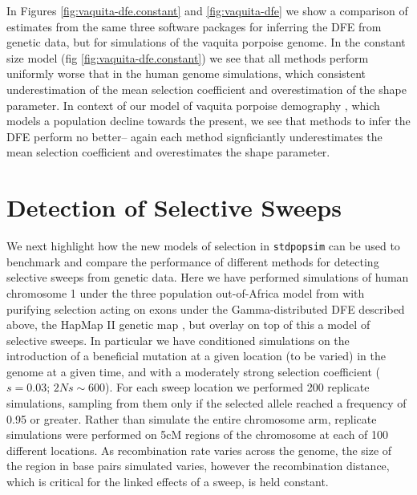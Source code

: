 \documentclass[hidelinks]{article}
\newcommand{\stdpopsim}{\texttt{stdpopsim}\xspace}
\begin{document}
    In Figures \ref{fig:vaquita-dfe.constant} and \ref{fig:vaquita-dfe} we show a comparison of estimates
    from the same three software packages for inferring the DFE from genetic data, but for simulations of the
    vaquita porpoise genome. In the constant size model (fig \ref{fig:vaquita-dfe.constant}) we see that all methods
    perform uniformly worse that in the human genome simulations, which consistent underestimation of the mean selection coefficient    
    and overestimation of the shape parameter. 
    In context of our model of vaquita porpoise demography \citep{robinson2022critically}, which models a population
    decline towards the present, we see that methods to infer the DFE perform no better-- again each method 
    signficiantly underestimates the mean selection coefficient and overestimates the shape parameter.

\section*{Detection of Selective Sweeps}
    \label{sweeps}
    We next highlight how the new models of selection in \stdpopsim can be used to benchmark and compare
    the performance of different methods for detecting selective sweeps from genetic data. 
    Here we have performed simulations of human chromosome 1 under the three population out-of-Africa model from \cite{gutenkunst2009inferring}
    with purifying selection acting on exons under the Gamma-distributed DFE described above, the HapMap II genetic map \citep{international2007second},    
    but overlay on top of this a model of selective sweeps. In particular we have conditioned simulations on the introduction of a beneficial mutation
    at a given location (to be varied) in the genome at a given time, and with a moderately strong selection coefficient ($s = 0.03$; $2Ns \sim 600$).
    For each sweep location we performed 200 replicate simulations, sampling from them only if the selected allele reached a frequency of
    0.95 or greater. Rather than simulate the entire chromosome arm, replicate simulations were performed on 5cM regions of the chromosome
    at each of 100 different locations. As recombination rate varies across the genome, the size of the region in base pairs simulated varies,
    however the recombination distance, which is critical for the linked effects of a sweep, is held constant.
  
\end{document}
